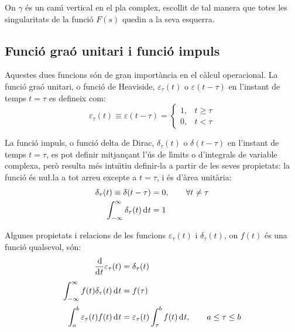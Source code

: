 On $\gamma$ \'{e}s un cam\'{\i} vertical en el pla complex, escollit de tal
manera que totes les singularitats de la funci\'{o} $F(s)$ quedin a la
seva esquerra.

\subsection{Funci\'{o} gra\'{o} unitari i funci\'{o} impuls} 

Aquestes dues funcions s\'{o}n de gran import\`{a}ncia en el c\`{a}lcul
operacional. La funci\'{o} gra\'{o} unitari, o funci\'{o} de Heaviside,
$\varepsilon_\tau(t)$ o $\varepsilon(t-\tau)$ en l'instant de temps
$t=\tau$ es defineix com:
\begin{equation}
    \varepsilon_\tau(t) \equiv \varepsilon(t-\tau) = \begin{cases} 1, & t \geq \tau \\ 0, & t < \tau \end{cases}
\end{equation}

La funci\'{o} impuls, o funci\'{o} delta de Dirac, $\delta_\tau(t)$ o
$\delta(t-\tau)$ en l'instant de temps $t=\tau$, es pot definir
mitjan\c{c}ant l'\'{u}s de l\'{\i}mits o d'integrals de variable complexa, per\`{o}
resulta m\'{e}s intu\"{\i}tiu definir-la a partir de les seves propietats: la
funci\'{o} \'{e}s nu{\l.l}a a tot arreu excepte a $t=\tau$, i \'{e}s d'\`{a}rea
unit\`{a}ria:
\begin{subequations}
\begin{align}
    \delta_\tau(t) \equiv \delta(t-\tau) &= 0, \qquad \forall t \neq \tau \\
    \int_{-\infty}^\infty \delta_\tau(t) \diff t &= 1
\end{align}
\end{subequations}

Algunes propietats i relacions de les funcions $\varepsilon_\tau(t)$ i $\delta_\tau(t)$, on $f(t)$ \'{e}s una funci\'{o} qualsevol, s\'{o}n:
\begin{align}
   \frac{\diff}{\diff t} \varepsilon_\tau (t) &= \delta_\tau(t) \\[0.5ex]
   \int_{-\infty}^\infty f(t) \delta_\tau (t) \diff t &= f(\tau) \\[0.5ex]
    \int_a^b \varepsilon_\tau (t) f(t) \diff t &= \varepsilon_\tau(t)
    \int_\tau^b f(t) \diff t, \qquad a\leq\tau\leq b
\end{align}



